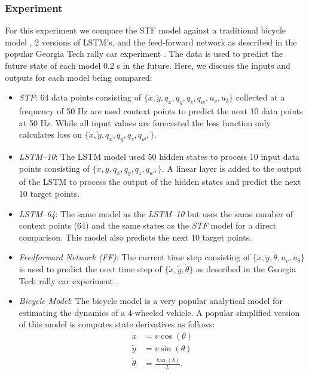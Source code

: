 \documentclass[letterpaper, 10 pt, conference]{ieeeconf}  %
\begin{document}
\subsubsection{Experiment}
For this experiment we compare the STF model against a traditional bicycle model \cite{rajamani20006}, 2 versions of LSTM's, and the feed-forward network as described in the popular Georgia Tech rally car experiment \cite{goldfain2019autorally}. The data is used to predict the future state of each model 0.2 s in the future. Here, we discuss the inputs and outputs for each model being compared:
\begin{itemize}
    \item \emph{STF}: 64 data points consisting of $\{\dot{x}, \dot{y}, q_x, q_y, q_z, q_w, u_v, u_\delta\}$  collected at a frequency of 50 Hz are used context points to predict the next 10 data points at 50 Hz. While all input values are forecasted the loss function only calculates loss on $\{\dot{x}, \dot{y}, q_x, q_y, q_z, q_w,\}$.
    \item \emph{LSTM--10}: The LSTM model used 50 hidden states to process 10 input data points consisting of $\{\dot{x}, \dot{y}, q_x, q_y, q_z, q_w,\}$. A linear layer is added to the output of the LSTM to process the output of the hidden states and predict the next 10 target points. 
    \item \emph{LSTM--64}: The same model as the \emph{LSTM--10} but uses the same number of context points (64) and the same states as the \emph{STF} model for a direct comparison. This model also predicts the next 10 target points. 
    \item \emph{Feedforward Network (FF)}: The current time step consisting of $\{\dot{x}, \dot{y}, \dot{\theta}, u_v, u_\delta\}$ is used to predict the next time step of $\{\dot{x}, \dot{y}, \dot{\theta}\}$ as described in the Georgia Tech rally car experiment \cite{goldfain2019autorally}.
    \item \emph{Bicycle Model}: The bicycle model \cite{bikemodel} is a very popular analytical model for estimating the dynamics of a 4-wheeled vehicle. A popular simplified version of this model is computes state derivatives as follows:
    \begin{align}\label{eq:bike}
    \dot{x} &= v\cos(\theta) \nonumber \\
    \dot{y} &= v\sin(\theta) \\
    \dot{\theta} &= \frac{\tan(\delta)}{L} \nonumber.
    \end{align}
\end{itemize}
\end{document}
